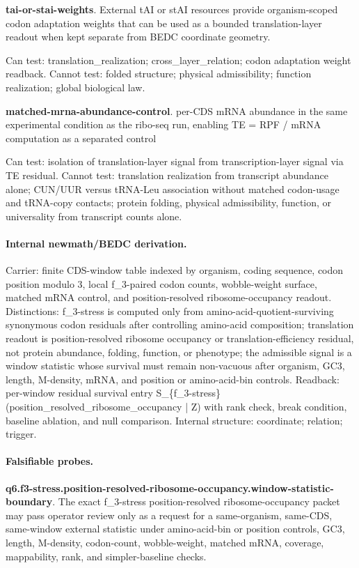 \textbf{tai-or-stai-weights}. External tAI or stAI resources provide organism-scoped codon adaptation weights that can be used as a bounded translation-layer readout when kept separate from BEDC coordinate geometry.

Can test: translation\_realization; cross\_layer\_relation; codon adaptation weight readback. Cannot test: folded structure; physical admissibility; function realization; global biological law.

\textbf{matched-mrna-abundance-control}. per-CDS mRNA abundance in the same experimental condition as the ribo-seq run, enabling TE = RPF / mRNA computation as a separated control

Can test: isolation of translation-layer signal from transcription-layer signal via TE residual. Cannot test: translation realization from transcript abundance alone; CUN/UUR versus tRNA-Leu association without matched codon-usage and tRNA-copy contacts; protein folding, physical admissibility, function, or universality from transcript counts alone.

\paragraph{Internal newmath/BEDC derivation.} Carrier: finite CDS-window table indexed by organism, coding sequence, codon position modulo 3, local f\_3-paired codon counts, wobble-weight surface, matched mRNA control, and position-resolved ribosome-occupancy readout. Distinctions: f\_3-stress is computed only from amino-acid-quotient-surviving synonymous codon residuals after controlling amino-acid composition; translation readout is position-resolved ribosome occupancy or translation-efficiency residual, not protein abundance, folding, function, or phenotype; the admissible signal is a window statistic whose survival must remain non-vacuous after organism, GC3, length, M-density, mRNA, and position or amino-acid-bin controls. Readback: per-window residual survival entry S\_\{f\_3-stress\}(position\_resolved\_ribosome\_occupancy | Z) with rank check, break condition, baseline ablation, and null comparison. Internal structure: coordinate; relation; trigger.

\paragraph{Falsifiable probes.}
\textbf{q6.f3-stress.position-resolved-ribosome-occupancy.window-statistic-boundary}. The exact f\_3-stress position-resolved ribosome-occupancy packet may pass operator review only as a request for a same-organism, same-CDS, same-window external statistic under amino-acid-bin or position controls, GC3, length, M-density, codon-count, wobble-weight, matched mRNA, coverage, mappability, rank, and simpler-baseline checks.

